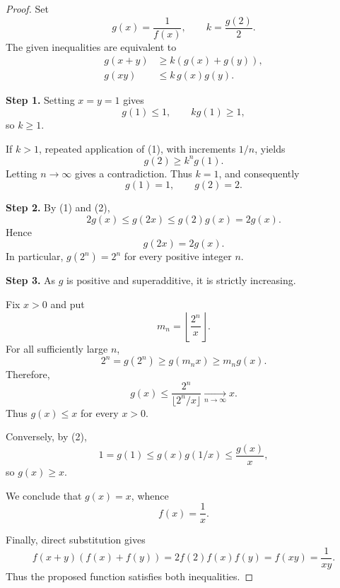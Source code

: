 
\begin{dlsummary}[title={\bfseries Solution 6. The Sum--Product Squeeze},breakable]

\begin{proof}
Set
\[
g(x)=\frac1{f(x)},\qquad k=\frac{g(2)}2.
\]
The given inequalities are equivalent to
\begin{align}
g(x+y)&\ge k(g(x)+g(y)), \tag{1}\\
g(xy)&\le k\,g(x)g(y). \tag{2}
\end{align}

\textbf{Step 1.} Setting $x=y=1$ gives
\[
g(1)\le1,\qquad kg(1)\ge1,
\]
so $k\ge1$.

If $k>1$, repeated application of (1), with
increments $1/n$, yields
\[
g(2)\ge k^n g(1).
\]
Letting $n\to\infty$ gives a contradiction.
Thus $k=1$, and consequently
\[
g(1)=1,\qquad g(2)=2.
\]

\textbf{Step 2.} By (1) and (2),
\[
2g(x)\le g(2x)\le g(2)g(x)=2g(x).
\]
Hence
\[
\boxed{g(2x)=2g(x).}
\]
In particular, $g(2^n)=2^n$ for every
positive integer $n$.

\textbf{Step 3.} As $g$ is positive and
superadditive, it is strictly increasing.

Fix $x>0$ and put
\[
m_n=\left\lfloor\frac{2^n}{x}\right\rfloor.
\]
For all sufficiently large $n$,
\[
2^n=g(2^n)\ge g(m_nx)\ge m_ng(x).
\]
Therefore,
\[
g(x)\le
\frac{2^n}{\lfloor 2^n/x\rfloor}
\xrightarrow[n\to\infty]{}x.
\]
Thus $g(x)\le x$ for every $x>0$.

Conversely, by (2),
\[
1=g(1)\le g(x)g(1/x)\le\frac{g(x)}x,
\]
so $g(x)\ge x$.

We conclude that $g(x)=x$, whence
\[
\boxed{f(x)=\frac1x}.
\]

Finally, direct substitution gives
\[
f(x+y)(f(x)+f(y))
=2f(2)f(x)f(y)
=f(xy)=\frac1{xy}.
\]
Thus the proposed function satisfies
both inequalities.
\end{proof}

\end{dlsummary}